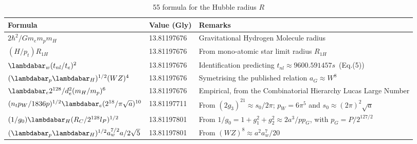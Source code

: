 \documentclass[a4paper,9pt]{article}
\newcounter{col}
\begin{document}
\begin{table}
\caption[Table \ref{tab:6:table6}: 55 Hubble radius formulas]{55 formula for the Hubble radius $R$}
\label{tab:6:table6}
  \hskip-2.0cm\begin{tabular}{lll}
    \toprule
    \cmidrule(r){1-3}
    Formula     & Value (Gly)  & Remarks \\
    \midrule
 
 $ 2\hbar^2/Gm_em_pm_H $ & 13.81197676 & Gravitational Hydrogen Molecule radius \cite{Sanchez2}\\ 
 
 $ (H/p_t)R_{1H}$ & 13.81197676 & From mono-atomic star limit radius  $R_{1H}$ \cite{Davies} \\
 
 $ \lambdabar_w (t_{nl}/t_e)^2$ & 13.81197676 & Identification predicting $t_{nl}\approx 9600.591457 s$~(Eq.(5)) \\
 
 $ (\lambdabar_{p} \lambdabar_{H})^{1/2} (WZ)^4$  & 13.81197676 & Symetrising the published relation $a_G \approx W^8$ \cite{Rees} \\
 
 $\lambdabar_{e} 2^{128}/d_e^2(m_H/m_p)^6$  & 13.81197676   & Empirical, from the Combinatorial Hierarchy Lucas Large Number \cite{Bastin}\\
 
 
  $(n_tp_W/1836p)^{1/2}\lambdabar_{e} (2^{18}/\pi \sqrt a)^{10}$  & 13.81197711   & From $(2g_3)^{21} \approx s_0/2\pi$; $p_W = 6\pi^5$ and $s_0 \approx (2\pi)^2 \sqrt a$\\
 
 
 
  $ (1/g_0) \lambdabar_H (R_C/2^{128}l_P)^{1/2} $  & 13.81197801 & From $1/g_0 = 1+g_1^2+g_2^2\approx2a^3/pp_G$, with $p_G = P/2^{127/2}$\\ 
 
 
 $ (\lambdabar_{p} \lambdabar_{H})^{1/2} a_w^{7/2} a/2\sqrt 5 $  & 13.81197801 & From $(WZ)^8 \approx a^2a_w^7/20$\\
 
  

\end{tabular}
\end{table}
\end{document}
